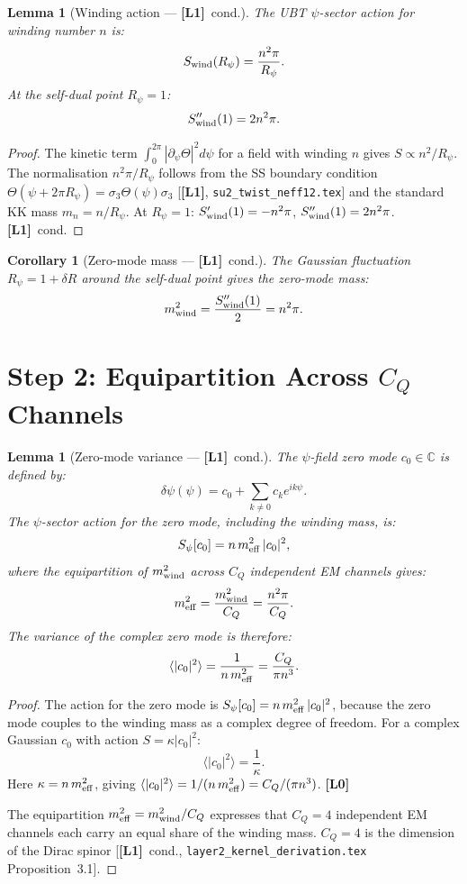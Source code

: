 \documentclass[12pt,a4paper]{article}
\newtheorem{lemma}[theorem]{Lemma}
\newtheorem{corollary}[theorem]{Corollary}
\theoremstyle{definition}\newtheorem{definition}[theorem]{Definition}
\theoremstyle{remark}\newtheorem{remark}[theorem]{Remark}
\newcommand{\Lz}{\textbf{[L0]}}
\newcommand{\Lo}{\textbf{[L1]}}
\begin{document}
\begin{lemma}[Winding action — \Lo\ cond.]
\label{lem:wind_action}
The UBT $\psi$-sector action for winding number $n$ is:
\[
  S_{\rm wind}(R_\psi) = \frac{n^2\pi}{R_\psi}.
\]
At the self-dual point $R_\psi = 1$:
\[
  S_{\rm wind}''(1) = 2n^2\pi.
\]
\end{lemma}

\begin{proof}
The kinetic term $\int_0^{2\pi}|\partial_\psi\Theta|^2 d\psi$ for a
field with winding $n$ gives $S \propto n^2/R_\psi$.  The normalisation
$n^2\pi/R_\psi$ follows from the SS boundary condition
$\Theta(\psi+2\pi R_\psi)=\sigma_3\Theta(\psi)\sigma_3$ [\Lo,
\texttt{su2\_twist\_neff12.tex}] and the standard KK mass
$m_n = n/R_\psi$.  At $R_\psi=1$:
$S_{\rm wind}'(1) = -n^2\pi$,
$S_{\rm wind}''(1) = 2n^2\pi$. \Lo\ cond.
\end{proof}

\begin{corollary}[Zero-mode mass — \Lo\ cond.]
\label{cor:m2}
The Gaussian fluctuation $R_\psi = 1 + \delta R$ around the
self-dual point gives the zero-mode mass:
\[
  m^2_{\rm wind} = \frac{S_{\rm wind}''(1)}{2} = n^2\pi.
\]
\end{corollary}

\section{Step 2: Equipartition Across $C_Q$ Channels}
\label{sec:step2}

\begin{lemma}[Zero-mode variance — \Lo\ cond.]
\label{lem:c0var}
The $\psi$-field zero mode $c_0 \in \mathbb{C}$ is defined by:
\[
  \delta\psi(\psi) = c_0 + \sum_{k\neq 0} c_k e^{ik\psi}.
\]
The $\psi$-sector action for the zero mode, including the
winding mass, is:
\[
  S_\psi[c_0] = n\,m^2_{\rm eff}\,|c_0|^2,
\]
where the equipartition of $m^2_{\rm wind}$ across $C_Q$ independent
EM channels gives:
\[
  m^2_{\rm eff} = \frac{m^2_{\rm wind}}{C_Q} = \frac{n^2\pi}{C_Q}.
\]
The variance of the complex zero mode is therefore:
\[
  \langle|c_0|^2\rangle
  = \frac{1}{n\,m^2_{\rm eff}}
  = \frac{C_Q}{\pi n^3}.
\]
\end{lemma}

\begin{proof}
The action for the zero mode is $S_\psi[c_0] = n\,m^2_{\rm eff}\,|c_0|^2$,
because the zero mode couples to the winding mass as a complex
degree of freedom.  For a complex Gaussian $c_0$ with action
$S = \kappa|c_0|^2$:
\[
  \langle|c_0|^2\rangle = \frac{1}{\kappa}.
\]
Here $\kappa = n\,m^2_{\rm eff}$, giving
$\langle|c_0|^2\rangle = 1/(n\,m^2_{\rm eff}) = C_Q/(\pi n^3)$. \Lz

The equipartition $m^2_{\rm eff} = m^2_{\rm wind}/C_Q$ expresses
that $C_Q = 4$ independent EM channels each carry an equal share
of the winding mass.  $C_Q = 4$ is the dimension of the Dirac
spinor [\Lo\ cond., \texttt{layer2\_kernel\_derivation.tex}
Proposition~3.1].
\end{proof}
\end{document}
